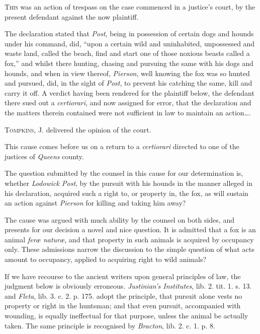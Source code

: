 


\textsc{This} was an action of trespass on the case commenced in a justice's
court, by the present defendant against the now plaintiff.

The declaration stated that \textit{Post}, being in possession of certain dogs
and hounds under his command, did, ``upon a certain wild and uninhabited,
unpossessed and waste land, called the beach, find and start one of those
noxious beasts called a fox,'' and whilst there hunting, chasing and pursuing
the same with his dogs and hounds, and when in view thereof, \textit{Pierson},
well knowing the fox was so hunted and pursued, did, in the sight of
\textit{Post}, to prevent his catching the same, kill and carry it off. A
verdict having been rendered for the plaintiff below, the defendant there sued
out a \textit{certiorari}, and now assigned for error, that the declaration and
the matters therein contained were not sufficient in law to maintain an
action\ldots .

\opinion \textsc{Tompkins}, J. delivered the opinion of the court.

This cause comes before us on a return to a \textit{certiorari} directed to one
of the justices of \textit{Queens} county.

The question submitted by the counsel in this cause for our determination is,
whether \textit{Lodowick Post}, by the pursuit with his hounds in the manner
alleged in his declaration, acquired such a right to, or property in, the fox,
as will sustain an action against \textit{Pierson} for killing and taking him
away?

The cause was argued with much ability by the counsel on both sides, and
presents for our decision a novel and nice question. It is admitted that a fox
is an animal \textit{fer{\ae} natur{\ae}}, and that property in such animals is
acquired by occupancy only. These admissions narrow the discussion to the simple
question of what acts amount to occupancy, applied to acquiring right to wild
animals?

If we have recourse to the ancient writers upon general principles of law, the
judgment below is obviously erroneous. \textit{Justinian's Institutes}, lib. 2.
tit. 1. s. 13. and \textit{Fleta}, lib. 3. c. 2. p. 175. adopt the principle,
that pursuit alone vests no property or right in the huntsman; and that even
pursuit, accompanied with wounding, is equally ineffectual for that purpose,
unless the animal be actually taken. The same principle is recognised by
\textit{Bracton}, lib. 2. c. 1. p. 8.

